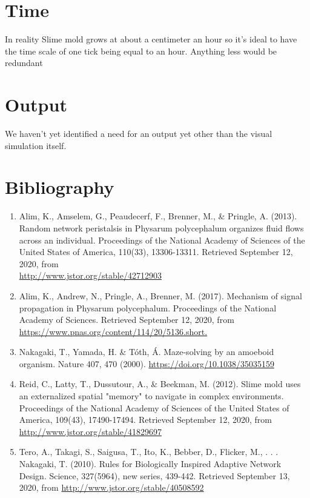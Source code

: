 \documentclass[11pt]{article}
\begin{document}
\section{Time}
In reality Slime mold grows at about a centimeter an hour so it’s ideal to have the time scale of one tick being equal to an hour. Anything less would be redundant
\section{Output}
We haven’t yet identified a need for an output yet other than the visual simulation itself.

\newpage
\section{Bibliography}

\begin{enumerate}
    \item Alim, K., Amselem, G., Peaudecerf, F., Brenner, M., & Pringle, A. (2013). Random network peristalsis in Physarum polycephalum organizes fluid flows across an individual. Proceedings of the National Academy of Sciences of the United States of America, 110(33), 13306-13311. Retrieved September 12, 2020, from \\ \url{http://www.jstor.org/stable/42712903}
    \item Alim, K., Andrew, N., Pringle, A., Brenner, M. (2017). Mechanism of signal propagation in Physarum polycephalum. Proceedings of the National Academy of Sciences. Retrieved September 12, 2020, from \\\url{https://www.pnas.org/content/114/20/5136.short.}

    \item Nakagaki, T., Yamada, H. & Tóth, Á. Maze-solving by an amoeboid organism. Nature 407, 470 (2000). \url{https://doi.org/10.1038/35035159}
    
    \item Reid, C., Latty, T., Dussutour, A., & Beekman, M. (2012). Slime mold uses an externalized spatial "memory" to navigate in complex environments. Proceedings of the National Academy of Sciences of the United States of America, 109(43), 17490-17494. Retrieved September 12, 2020, from \url{http://www.jstor.org/stable/41829697}
    
    \item Tero, A., Takagi, S., Saigusa, T., Ito, K., Bebber, D., Flicker, M., . . . Nakagaki, T. (2010). Rules for Biologically Inspired Adaptive Network Design. Science, 327(5964), new series, 439-442. Retrieved September 13, 2020, from \url{http://www.jstor.org/stable/40508592}
\end{enumerate}
\end{document}

